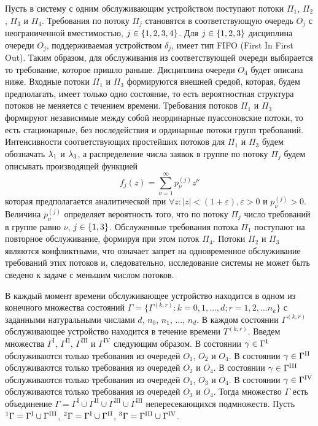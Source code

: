 \documentclass[a4paper,12pt,russian]{extarticle}
\newcommand{\G}{\Gamma}
\newcommand{\ga}[1]{\Gamma^{\left( #1 \right)} }
\newcommand{\Tt}[1]{T^{\left( #1 \right)} }
\begin{document}
Пусть в систему с одним обслуживающим устройством поступают потоки $\Pi_1$, $\Pi_2$, $\Pi_3$  и $\Pi_4$. Требования по потоку $\Pi_j$ становятся в соответствующую очередь $O_j$ с неограниченной вместимостью, $j\in \left\{1, 2, 3, 4\right\}$. Для $j \in \left\{1, 2, 3\right\}$ дисциплина очереди $O_j$, поддерживаемая устройством $\delta_j$, имеет тип FIFO (First In First Out). Таким образом, для обслуживания из соответствующей очереди выбирается то требование, которое пришло раньше. Дисциплина очереди $O_4$ будет описана ниже. Входные потоки $\Pi_1$ и $\Pi_3$ формируются внешней средой, которая, будем предполагать, имеет только одно состояние, то есть вероятностная структура потоков не меняется с течением времени. Требования потоков $\Pi_1$ и $\Pi_3$ формируют независимые между собой неординарные пуассоновские потоки, то есть  стационарные, без последействия и ординарные потоки групп требований. Интенсивности соответствующих простейших потоков для $\Pi_1$ и $\Pi_3$ будем обозначать $\lambda_1$ и $\lambda_3$, а распределение числа заявок в группе по потоку $\Pi_j$ будем описывать производящей функцией
\begin{equation}
f_j(z) = \sum_{\nu=1}^{\infty} p_{\nu}^{(j)} z ^{\nu}
\end{equation}
которая предполагается аналитической при $\forall z \colon |z|<(1+\varepsilon), \varepsilon > 0$ и $p_{\nu}^{(j)}>0$. Величина $p_{\nu}^{(j)}$ определяет вероятность того, что по потоку $\Pi_j$ число требований в группе равно $\nu$, $j\in \left\{1,3\right\}$. Обслуженные требования потока $\Pi_1$ поступают на повторное обслуживание, формируя при этом поток $\Pi_4$. Потоки $\Pi_2$ и $\Pi_3$ являются конфликтными, что означает запрет на одновременное обслуживание требований этих потоков и, следовательно, исследование системы не может быть сведено к задаче с меньшим числом потоков. 
 
 В каждый момент времени обслуживающее устройство находится в одном из конечного множества состояний $\Gamma=\{\G^{(k,r)} \colon k=0,1,\ldots,d; r=1,2,\ldots n_k\}$ с заданными натуральными числами $d$, $n_0$, $n_1$, $\ldots$, $n_d$. В каждом состоянии $\ga{k,r}$ обслуживающее устройство находится в течение времени $\Tt{k,r}$. Введем множества $\G^{\mathrm{I}}$, $\G^{\mathrm{II}}$, $\G^{\mathrm{III}}$ и $\G^{\mathrm{IV}}$ следующим образом. В состоянии $\gamma \in \G^{\mathrm{\Rmnum{1}}}$ обслуживаются только требования из очередей $O_1$, $O_2$ и $O_4$.
В состоянии $\gamma \in \G^{\mathrm{\Rmnum{2}}}$ обслуживаются только требования из очередей $O_2$ и $O_4$.
В состоянии $\gamma \in \G^{\mathrm{\Rmnum{3}}}$ обслуживаются только требования из очередей $O_1$, $O_3$ и $O_4$.
В состоянии $\gamma \in \G^{\mathrm{\Rmnum{4}}}$ обслуживаются только требования из очередей $O_3$ и $O_4$.
Тогда множество $\G$ есть объединение $\G = \G^{\mathrm{I}} \cup \G^{\mathrm{II}} \cup \G^{\mathrm{III}} \cup \G^{\mathrm{III}}$ непересекающихся подмножеств. 
Пусть ${}^1\G=\G^{\mathrm{\Rmnum{1}}} \cup \G^{\mathrm{\Rmnum{3}}}$, 
${}^2\G=\G^{\mathrm{\Rmnum{1}}} \cup \G^{\mathrm{\Rmnum{2}}}$,
${}^3\G=\G^{\mathrm{\Rmnum{3}}} \cup \G^{\mathrm{\Rmnum{4}}}$.
\end{document}

